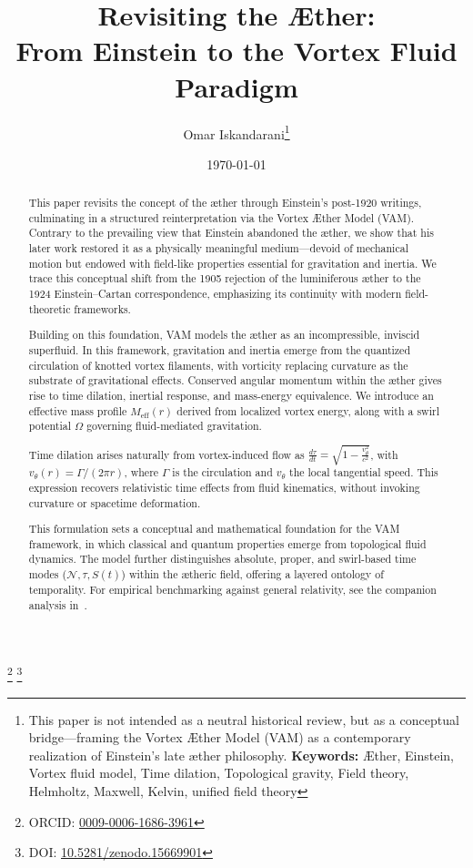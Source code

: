 \documentclass[preprint]{revtex4-2}
\begin{document}
\title{Revisiting the Æther:\\ From Einstein to the Vortex Fluid Paradigm}
\author{Omar Iskandarani\footnote{\scriptsize This paper is not intended as a neutral historical review, but as a conceptual bridge—framing the Vortex Æther Model (VAM) as a contemporary realization of Einstein’s late æther philosophy. \textbf{Keywords:} Æther, Einstein, Vortex fluid model, Time dilation, Topological gravity, Field theory, Helmholtz, Maxwell, Kelvin, unified field theory}}
\thanks{ORCID: \href{https://orcid.org/0009-0006-1686-3961}{0009-0006-1686-3961}}
\thanks{DOI: \href{https://doi.org/10.5281/zenodo.15669901}{10.5281/zenodo.15669901}}
\date{\today}
\maketitle
\begin{abstract}
This paper revisits the concept of the æther through Einstein’s post-1920 writings, culminating in a structured reinterpretation via the Vortex Æther Model (VAM). Contrary to the prevailing view that Einstein abandoned the æther, we show that his later work restored it as a physically meaningful medium—devoid of mechanical motion but endowed with field-like properties essential for gravitation and inertia. We trace this conceptual shift from the 1905 rejection of the luminiferous æther to the 1924 Einstein–Cartan correspondence, emphasizing its continuity with modern field-theoretic frameworks.

Building on this foundation, VAM models the æther as an incompressible, inviscid superfluid. In this framework, gravitation and inertia emerge from the quantized circulation of knotted vortex filaments, with vorticity replacing curvature as the substrate of gravitational effects. Conserved angular momentum within the æther gives rise to time dilation, inertial response, and mass-energy equivalence. We introduce an effective mass profile \( M_{\text{eff}}(r) \) derived from localized vortex energy, along with a swirl potential \( \Omega \) governing fluid-mediated gravitation.

Time dilation arises naturally from vortex-induced flow as \( \frac{d\tau}{dt} = \sqrt{1 - \frac{v_\theta^2}{c^2}} \), with \( v_\theta(r) = \Gamma / (2\pi r) \), where \( \Gamma \) is the circulation and \( v_\theta \) the local tangential speed. This expression recovers relativistic time effects from fluid kinematics, without invoking curvature or spacetime deformation.

This formulation sets a conceptual and mathematical foundation for the VAM framework, in which classical and quantum properties emerge from topological fluid dynamics. The model further distinguishes absolute, proper, and swirl-based time modes (\( \mathcal{N}, \tau, S(t) \)) within the ætheric field, offering a layered ontology of temporality. For empirical benchmarking against general relativity, see the companion analysis in~\cite{iskandarani2025benchmark}.

\end{abstract}
\end{document}
